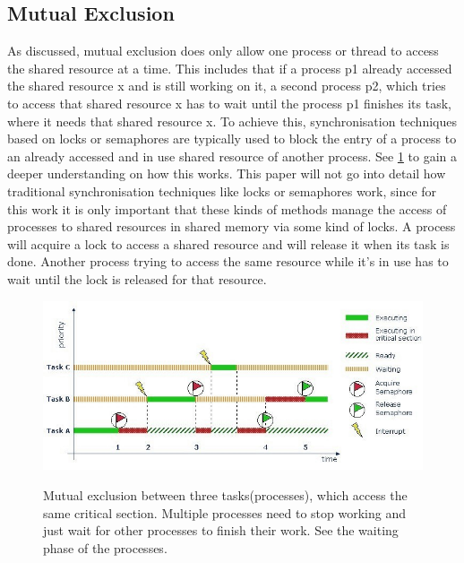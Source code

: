 \subsection{Mutual Exclusion}\label{subsec:mutual-exclusion}

As discussed, mutual exclusion does only allow one process or thread to access the shared resource at a time. This includes that if a process p1 already accessed the shared resource x and is still working on it, a second process p2, which tries to access that shared resource x has to wait until the process p1 finishes its task, where it needs that shared resource x. To achieve this, synchronisation techniques based on locks or semaphores are typically used to block the entry of a process to an already accessed and in use shared resource of another process. See \cref{fig:mutual-exclusion} to gain a deeper understanding on how this works. This paper will not go into detail how traditional synchronisation techniques like locks or semaphores work, since for this work it is only important that these kinds of methods manage the access of processes to shared resources in shared memory via some kind of locks. A process will acquire a lock to access a shared resource and will release it when its task is done. Another process trying to access the same resource while it's in use has to wait until the lock is released for that resource.

\begin{figure}[!ht]
    \centering
    \captionsetup{justification=centering}
    \caption{Mutual exclusion between three tasks(processes), which access the same critical section. Multiple processes need to stop working and just wait for other processes to finish their work. See the waiting phase of the processes.}
    \includegraphics[width=135mm]{images/mutual_exclusion.jpg}
    \cite{MutualExclusion}
    \label{fig:mutual-exclusion}
\end{figure}

